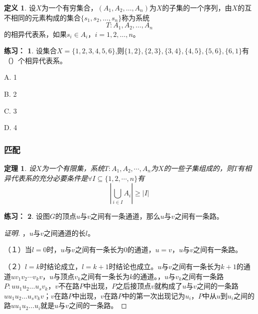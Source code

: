 \documentclass{beamer}
\newtheorem{Thm}{定理}[section]
\theoremstyle{definition}
\newtheorem{Def}{定义}[section]
\theoremstyle{example}
\newtheorem*{Exercise}{练习：}
\begin{document}
\begin{CJK}{UTF8}{gbsn}
\begin{frame}
  \begin{Def}\justifying\let\raggedright\justifying
    设$X$为一个有穷集合，$(A_1,A_2,\ldots,A_n)$为$X$的子集的一个序列，由$X$的互不相同的元素构成的集合$\{s_1,s_2,\ldots,s_n\}$称为系统\[T:A_1,A_2,\ldots,A_n\]的\alert{相异代表系}，如果$s_i\in A_i$，$i=1,2,\ldots,n$。
  \end{Def}

\end{frame}
\begin{frame}
  \begin{Exercise}\justifying\let\raggedright\justifying
    设集合$X=\{1,2,3,4,5,6\}$,则$\{1,2\},\{2,3\},\{3,4\},\{4,5\},\{5,6\},\{6,1\}$有（）个相异代表系。

    A. 1

    B. 2

    C. 3

    D. 4
  \end{Exercise}
\end{frame}
\begin{frame}
  \frametitle{匹配}
    \begin{Thm}\justifying\let\raggedright\justifying
    设$X$为一个有限集，系统$T:A_1,A_2,\cdots,A_n$为$X$的一些子集组成的，则$T$有相异代表系的充分必要条件是$\forall I \subseteq \{1,2,\cdots, n\}$有
    \[|\bigcup_{i\in I}A_i|\geq |I|\]
  \end{Thm}
\end{frame}


\begin{frame}
  \begin{Exercise}
  设图$G$的顶点$u$与$v$之间有一条通道，那么$u$与$v$之间有一条路。
\end{Exercise}
\pause
\begin{proof}[证明]\justifying\let\raggedright\justifying
{}，$u$与$v$之间通道的长$l$。

  \pause（１）当$l=0$时，$u$与$v$之间有一条长为$0$的通道，$u=v$，$u$与$v$之间有一条路。

  \pause （２）$l=k$时结论成立，$l=k+1$时结论也成立。$u$与$v$之间有一条长为$k+1$的通道$uv_1v_2\cdots v_kv$，$u$与顶点$v_k$之间有一条长为$k$的通道。，\pause$u$与$v_k$之间有一条路$P:uu_1u_2\ldots u_sv_k$，$v$不在路$P$中出现，$P$之后接顶点$v$就构成了$u$与$v$之间的一条路$uu_1u_2\ldots u_sv_kv$；$v$在路$P$中出现，$v$在路$P$中的第一次出现记为$u_i$，$P$中从$u$到$u_i$之间的路$uu_1u_2\ldots u_i$就是$u$与$v$之间的一条路。
\end{proof}


\end{frame}
\end{CJK}
\end{document}
